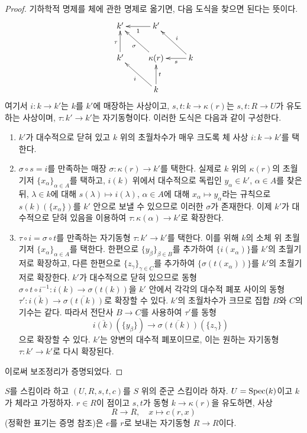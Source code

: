 \begin{proof}
기하학적 명제를 체에 관한 명제로 옮기면, 다음 도식을 찾으면 된다는 뜻이다.
$$
\xymatrix{
k' & k' \ar[l]^1 & \\
k' \ar[u]^\tau & \kappa(r) \ar[lu]^\sigma & k \ar[l]^-s \ar[lu]_i \\
& k \ar[lu]^i \ar[u]_t
}
$$
여기서 $i : k \to k'$는 $k$를 $k'$에 매장하는 사상이고,
$s, t : k \to \kappa(r)$는 $s, t : R \to U$가 유도하는 사상이며,
$\tau : k' \to k'$는 자기동형이다. 이러한 도식은 다음과 같이 구성한다.
\begin{enumerate}
\item $k'$가 대수적으로 닫혀 있고 $k$ 위의 초월차수가 매우 크도록
체 사상 $i : k \to k'$를 택한다.
\item $\sigma \circ s = i$를 만족하는 매장
$\sigma : \kappa(r) \to k'$를 택한다. 실제로 $k$ 위의 $\kappa(r)$의
초월기저 $\{x_\alpha\}_{\alpha \in A}$를 택하고, $i(k)$ 위에서
대수적으로 독립인 $y_\alpha \in k'$, $\alpha \in A$를 찾은 뒤,
$\lambda \in k$에 대해 $s(\lambda) \mapsto i(\lambda)$,
$\alpha \in A$에 대해 $x_\alpha \mapsto y_\alpha$라는 규칙으로
$s(k)(\{x_\alpha\})$를 $k'$ 안으로 보낼 수 있으므로 이러한 $\sigma$가 존재한다.
이제 $k'$가 대수적으로 닫혀 있음을 이용하여
$\tau : \kappa(\alpha) \to k'$로 확장한다.
\item $\tau \circ i = \sigma \circ t$를 만족하는 자기동형
$\tau : k' \to k'$를 택한다. 이를 위해 $k$의 소체 위 초월기저
$\{x_\alpha\}_{\alpha \in A}$를 택한다. 한편으로 $\{y_\beta\}_{\beta \in B}$를
추가하여 $\{i(x_\alpha)\}$를 $k'$의 초월기저로 확장하고, 다른 한편으로
$\{z_\gamma\}_{\gamma \in C}$를 추가하여 $\{\sigma(t(x_\alpha))\}$를
$k'$의 초월기저로 확장한다. $k'$가 대수적으로 닫혀 있으므로 동형
$\sigma \circ t \circ i^{-1} : i(k) \to \sigma(t(k))$을
$k'$ 안에서 각각의 대수적 폐포 사이의 동형
$\tau' : \overline{i(k)} \to \overline{\sigma(t(k))}$로 확장할 수 있다.
$k'$의 초월차수가 크므로 집합 $B$와 $C$의 기수는 같다. 따라서 전단사
$B \to C$를 사용하여 $\tau'$를 동형
$$
\overline{i(k)}(\{y_\beta\})
\longrightarrow
\overline{\sigma(t(k))}(\{z_\gamma\})
$$
으로 확장할 수 있다. $k'$는 양변의 대수적 폐포이므로, 이는 원하는 자기동형
$\tau : k' \to k'$로 다시 확장된다.
\end{enumerate}
이로써 보조정리가 증명되었다.
\end{proof}

\begin{lemma}
\label{lemma-groupoid-on-field-move-point}
$S$를 스킴이라 하고 $(U, R, s, t, c)$를 $S$ 위의 준군 스킴이라 하자.
$U = \mathop{\mathrm{Spec}}(k)$이고 $k$가 체라고 가정하자. $r \in R$이 점이고
$s, t$가 동형 $k \to \kappa(r)$을 유도하면, 사상
$$
R \longrightarrow R, \quad
x \longmapsto c(r, x)
$$
(정확한 표기는 증명 참조)은 $e$를 $r$로 보내는 자기동형 $R \to R$이다.
\end{lemma}

